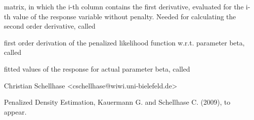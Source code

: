 \begin{Value}
\begin{ldescription}
\item[\code{Abl1.cal}] matrix, in which the i-th column contains the first derivative, evaluated for the i-th value of the response variable without penalty. Needed for calculating the second order derivative, called 
\item[\code{Abl1.pen}] first order derivation of the penalized likelihood function w.r.t. parameter beta, called  
\item[\code{f.hat.val}] fitted values of the response for actual parameter beta, called 
\end{ldescription}
\end{Value}
\begin{Author}\relax
Christian Schellhase <cschellhase@wiwi.uni-bielefeld.de>
\end{Author}
\begin{References}\relax
Penalized Density Estimation, Kauermann G. and Schellhase C. (2009), to appear.
\end{References}

